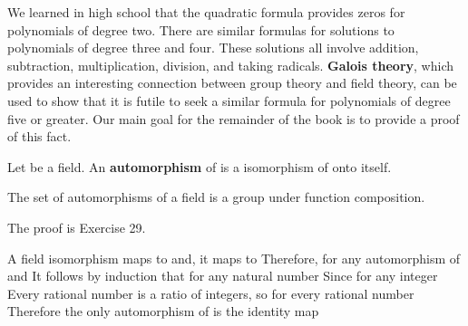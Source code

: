 \documentclass[11pt,oneside]{article}
\begin{document}
\fi
\renewcommand{\BookFooter}{Section 43 Introduction to Galois Theory}
\ifdefined\BookMaster\else\setcounter{page}{341}\fi

\BookNarrativetrue

\begin{BookBody}



\noindent We learned in high school that the quadratic formula provides zeros for polynomials of degree two. There are similar formulas for solutions to polynomials of degree three and four. These solutions all involve addition, subtraction, multiplication, division, and taking radicals.\textbf{ Galois theory}, which provides an interesting connection between group theory and field theory, can be used to show that it is futile to seek a similar formula for polynomials of degree five or greater. Our main goal for the remainder of the book is to provide a proof of this fact.

 Let  be a field. An\textbf{ automorphism} of  is a isomorphism of  onto itself. \BookEnd{\blacksquare}

 The set of automorphisms of a field  is a group under function composition.

 The proof is Exercise 29. \BookEnd{\blacklozenge}

 A field isomorphism  maps  to  and, it maps  to  Therefore, for any automorphism \BookInline{\phi } of  and  It follows by induction that  for any natural number  Since  for any integer   Every rational number is a ratio of integers, so  for every rational number  Therefore the only automorphism of  is the identity map\BookEnd{\blacktriangle}


\end{BookBody}
\end{document}
